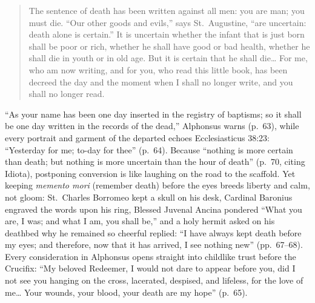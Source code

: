 \begin{quote}
The sentence of death has been written against all men: you are man; you must die. ``Our other goods and evils,'' says St.\ Augustine, ``are uncertain: death alone is certain.'' It is uncertain whether the infant that is just born shall be poor or rich, whether he shall have good or bad health, whether he shall die in youth or in old age. But it is certain that he shall die\ldots{} For me, who am now writing, and for you, who read this little book, has been decreed the day and the moment when I shall no longer write, and you shall no longer read.
\end{quote}

``As your name has been one day inserted in the registry of baptisms; so it shall be one day written in the records of the dead,'' Alphonsus warns (p.\ 63), while every portrait and garment of the departed echoes Ecclesiasticus 38:23: ``Yesterday for me; to-day for thee'' (p.\ 64). Because ``nothing is more certain than death; but nothing is more uncertain than the hour of death'' (p.\ 70, citing Idiota), postponing conversion is like laughing on the road to the scaffold. Yet keeping \emph{memento mori} (remember death) before the eyes breeds liberty and calm, not gloom: St.\ Charles Borromeo kept a skull on his desk, Cardinal Baronius engraved the words upon his ring, Blessed Juvenal Ancina pondered ``What you are, I was; and what I am, you shall be,'' and a holy hermit asked on his deathbed why he remained so cheerful replied: ``I have always kept death before my eyes; and therefore, now that it has arrived, I see nothing new'' (pp.\ 67--68). Every consideration in Alphonsus opens straight into childlike trust before the Crucifix: ``My beloved Redeemer, I would not dare to appear before you, did I not see you hanging on the cross, lacerated, despised, and lifeless, for the love of me\ldots{} Your wounds, your blood, your death are my hope'' (p.\ 65).
